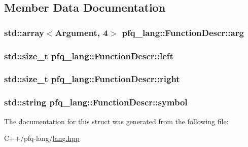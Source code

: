 \subsection{Member Data Documentation}
\hypertarget{structpfq__lang_1_1FunctionDescr_a30060a300e3162c65b2bcaf8bde97709}{
\subsubsection[{arg}]{\setlength{\rightskip}{0pt plus 5cm}std\+::array$<${\bf Argument}, 4$>$ pfq\+\_\+lang\+::\+Function\+Descr\+::arg}}\label{structpfq__lang_1_1FunctionDescr_a30060a300e3162c65b2bcaf8bde97709}
\hypertarget{structpfq__lang_1_1FunctionDescr_a480af36e2436822c212bc0886f28c076}{
\subsubsection[{left}]{\setlength{\rightskip}{0pt plus 5cm}std\+::size\+\_\+t pfq\+\_\+lang\+::\+Function\+Descr\+::left}}\label{structpfq__lang_1_1FunctionDescr_a480af36e2436822c212bc0886f28c076}
\hypertarget{structpfq__lang_1_1FunctionDescr_a36c36e8d567da963d826bed62c9b750f}{
\subsubsection[{right}]{\setlength{\rightskip}{0pt plus 5cm}std\+::size\+\_\+t pfq\+\_\+lang\+::\+Function\+Descr\+::right}}\label{structpfq__lang_1_1FunctionDescr_a36c36e8d567da963d826bed62c9b750f}
\hypertarget{structpfq__lang_1_1FunctionDescr_a58a21262184201b670246fdfdf0cef92}{
\subsubsection[{symbol}]{\setlength{\rightskip}{0pt plus 5cm}std\+::string pfq\+\_\+lang\+::\+Function\+Descr\+::symbol}}\label{structpfq__lang_1_1FunctionDescr_a58a21262184201b670246fdfdf0cef92}


The documentation for this struct was generated from the following file\+:\begin{DoxyCompactItemize}
\item 
C++/pfq-\/lang/\hyperlink{lang_8hpp}{lang.\+hpp}\end{DoxyCompactItemize}
